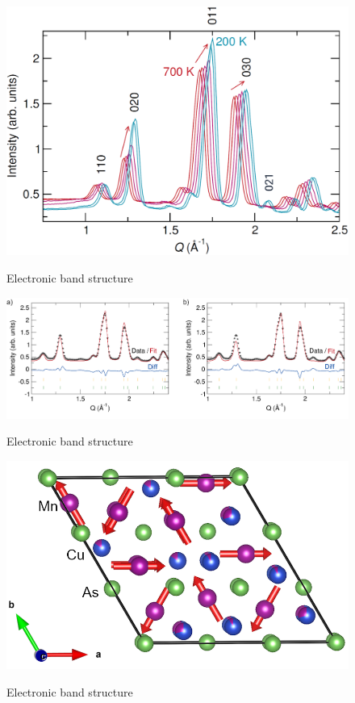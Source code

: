 \documentclass[11pt,edeposit,draftthesis]{uiucthesis2020}
\begin{document}
\begin{mainmatter}
\begin{figure}
\centering\includegraphics[width=\columnwidth]{figures/ch5/WAND_data.png} \\
\caption{\label{fig:WAND_data}
Electronic band structure
}
\end{figure}

\begin{figure}
\centering\includegraphics[width=\columnwidth]{figures/ch5/wand_refinement.png} \\
\caption{\label{fig:wand_refinement}
Electronic band structure
}
\end{figure}

\begin{figure}
\centering\includegraphics[width=\columnwidth]{figures/ch5/CuMnAs_magnetic_structure.png} \\
\caption{\label{fig:CuMnAs_magnetic_structure}
Electronic band structure
}
\end{figure}


\end{mainmatter}
\end{document}
